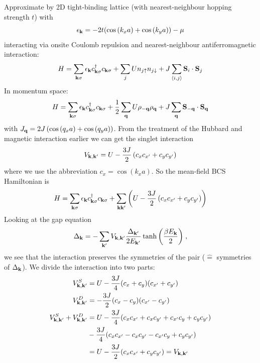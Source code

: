 Approximate by 2D tight-binding lattice (with nearest-neighbour hopping strength \(t\)) with
\begin{equation}
    \epsilon_{\mathbf{k}} = -2t (\cos{(k_x a)} + \cos{(k_y a)}) - \mu
\end{equation}
interacting via onsite Coulomb repulsion and nearest-neighbour antiferromagnetic interaction:
\begin{equation}
    H = \sum_{\mathbf{k} \sigma} \epsilon_{\mathbf{k}} c_{\mathbf{k} \sigma}^{\dagger} c_{\mathbf{k} \sigma} + \sum_{j} U n_{j \uparrow} n_{j \downarrow} + J \sum_{\langle i, j \rangle} \mathbf{S}_{i} \cdot \mathbf{S}_{j}
\end{equation}
In momentum space:
\begin{equation}
    H = \sum_{\mathbf{k} \sigma} \epsilon_{\mathbf{k}} c_{\mathbf{k} \sigma}^{\dagger} c_{\mathbf{k} \sigma} + \frac{1}{2} \sum_{\mathbf{q}} U \rho_{-\mathbf{q}} \rho_{\mathbf{q}} + J \sum_{\mathbf{q}} \mathbf{S}_{-{\mathbf{q}}} \cdot \mathbf{S}_{\mathbf{q}}
\end{equation}
with \(J_{\mathbf{q}} = 2 J \left( \cos{(q_x a)} + \cos{(q_y a)} \right)\).
From the treatment of the Hubbard and magnetic interaction earlier we can get the singlet interaction   
\begin{equation}
    V_{\mathbf{k}, \mathbf{k}^{\prime}} = U - \frac{3 J}{2} \left( c_x c_{x^{\prime}} + c_y c_{y^{\prime}} \right)
\end{equation}
where we use the abbreviation \(c_x = \cos{(k_x a)}\).
So the mean-field BCS Hamiltonian is
\begin{equation}
    H = \sum_{\mathbf{k} \sigma} \epsilon_{\mathbf{k}} c_{\mathbf{k} \sigma}^{\dagger} c_{\mathbf{k} \sigma} + \sum_{\mathbf{k} \mathbf{k}^{\prime}}\left( U - \frac{3 J}{2} \left( c_x c_{x^{\prime}} + c_y c_{y^{\prime}} \right) \right)
\end{equation}
Looking at the gap equation
\begin{equation}
    \Delta_{\mathbf{k}} = - \sum_{\mathbf{k}^{\prime}} V_{\mathbf{k}, \mathbf{k}^{\prime}}  \frac{\Delta_{\mathbf{k}^{\prime}}}{2 E_{\mathbf{k}^{\prime}}} \tanh{\left(\frac{\beta E_{\mathbf{k}}}{2}\right)}
    \;,
\end{equation}
we see that the interaction preserves the symmetries of the pair (\(\hat{=}\) symmetries of \(\Delta_{\mathbf{k}}\)).
We divide the interaction into two parts:
\begin{align}
    V_{\mathbf{k}, \mathbf{k}^{\prime}}^S &= U - \frac{3 J}{4} (c_x + c_y)(c_{x^{\prime}} + c_{y^{\prime}}) \\
    V_{\mathbf{k}, \mathbf{k}^{\prime}}^D &= -\frac{3 J}{2} (c_x - c_y)(c_{x^{\prime}} - c_{y^{\prime}}) \\
    V_{\mathbf{k}, \mathbf{k}^{\prime}}^S + V_{\mathbf{k}, \mathbf{k}^{\prime}}^D &= U - \frac{3 J}{4} (c_x c_{x^{\prime}} + c_x c_{y^{\prime}} + c_{x^{\prime}} c_y + c_y c_{y^{\prime}}) \\
    &- \frac{3 J}{4} (c_x c_{x^{\prime}} - c_x c_{y^{\prime}} - c_{x^{\prime}} c_y + c_y c_{y^{\prime}}) \\
    &= U - \frac{3 J}{2} (c_x c_{x^{\prime}} + c_y c_{y^{\prime}}) = V_{\mathbf{k}, \mathbf{k}^{\prime}}
\end{align}
